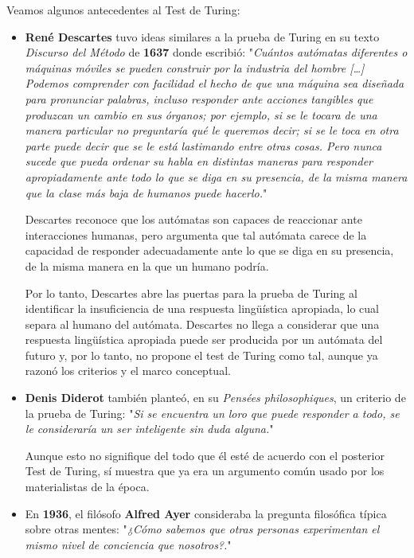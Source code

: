 \documentclass[a4paper, 11pt]{article} %
\begin{document}
Veamos algunos antecedentes al Test de Turing:
\begin{itemize}
    \item \textbf{René Descartes} tuvo ideas similares a la prueba de Turing en su texto \textit{Discurso del Método} de \textbf{1637} donde escribió: "\textit{Cuántos autómatas diferentes o máquinas móviles se pueden construir por la industria del hombre […] Podemos comprender con facilidad el hecho de que una máquina sea diseñada para pronunciar palabras, incluso responder ante acciones tangibles que produzcan un cambio en sus órganos; por ejemplo, si se le tocara de una manera particular no preguntaría qué le queremos decir; si se le toca en otra parte puede decir que se le está lastimando entre otras cosas. Pero nunca sucede que pueda ordenar su habla en distintas maneras para responder apropiadamente ante todo lo que se diga en su presencia, de la misma manera que la clase más baja de humanos puede hacerlo.}"

    Descartes reconoce que los autómatas son capaces de reaccionar ante interacciones humanas, pero argumenta que tal autómata carece de la capacidad de responder adecuadamente ante lo que se diga en su presencia, de la misma manera en la que un humano podría.

    Por lo tanto, Descartes abre las puertas para la prueba de Turing al identificar la insuficiencia de una respuesta lingüística apropiada, lo cual separa al humano del autómata. Descartes no llega a considerar que una respuesta lingüística apropiada puede ser producida por un autómata del futuro y, por lo tanto, no propone el test de Turing como tal, aunque ya razonó los criterios y el marco conceptual.

    \item \textbf{Denis Diderot} también planteó, en su \textit{Pensées philosophiques}, un criterio de la prueba de Turing: "\textit{Si se encuentra un loro que puede responder a todo, se le consideraría un ser inteligente sin duda alguna.}"

    Aunque esto no signifique del todo que él esté de acuerdo con el posterior Test de Turing, sí muestra que ya era un argumento común usado por los materialistas de la época.

    \item En \textbf{1936}, el filósofo \textbf{Alfred Ayer} consideraba la pregunta filosófica típica sobre otras mentes: "\textit{¿Cómo sabemos que otras personas experimentan el mismo nivel de conciencia que nosotros?.}"


\end{itemize}
\end{document}
